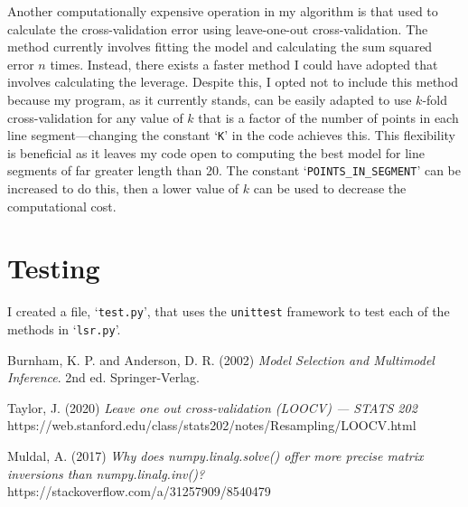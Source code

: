 \documentclass[onecolumn, 12pt, a4paper]{article}
\begin{document}
Another computationally expensive operation in my
algorithm is that used to calculate the cross-validation error 
using leave-one-out cross-validation.
The method currently involves
fitting the model and calculating the sum squared error
$n$ times. 
Instead, there exists a faster method I could have
adopted that involves calculating the leverage.
Despite this, I opted not to include this method 
because my program, as it currently stands, can be 
easily adapted to use $k$-fold cross-validation for 
any value of $k$ that is a factor of the number of points in each line segment---changing
the constant `\texttt{K}' in the code achieves this.
This flexibility is beneficial as it leaves my code open to
computing the best model for line segments of far greater length than 20.
The constant `\texttt{POINTS\_IN\_SEGMENT}' can be increased to do this,
then a lower value of $k$ can be used to decrease the computational cost.

\section{Testing}

I created a file, `\texttt{test.py}', that uses the
\texttt{unittest} framework to test each of the methods
in `\texttt{lsr.py}'.

\clearpage
\begin{thebibliography}{9}

    Burnham, K. P. and Anderson, D. R. (2002)
    \textit{Model Selection and Multimodel Inference}.
    2nd ed. Springer-Verlag.

    Taylor, J. (2020)
    \textit{Leave one out cross-validation (LOOCV) --- STATS 202}
    https://web.stanford.edu/class/stats202/notes/Resampling/LOOCV.html

    Muldal, A. (2017)
    \textit{Why does numpy.linalg.solve() offer more precise matrix inversions than numpy.linalg.inv()?}
    https://stackoverflow.com/a/31257909/8540479



\end{thebibliography}
    
\end{document}
